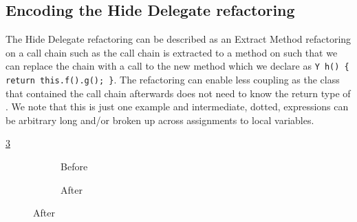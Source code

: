 \subsection{Encoding the Hide Delegate refactoring}\label{sec:hideDelegate}

The Hide Delegate refactoring can be described as an Extract Method refactoring on a call chain such as 
the call chain is extracted to a method on  such that we can replace the chain with a call to the new method 
which we declare as \lstinline|Y h() { return this.f().g(); }|.
The refactoring can enable less
coupling as the class that contained the call chain afterwards does not need to know the return type of .
We note that this is just one example and intermediate, dotted, expressions can be arbitrary long and/or broken up across assignments to local variables.

\ref{lst:HideDelegate-nofields-refinity}


\begin{figure}
  \centering
  \begin{subfigure}[b]{.4\linewidth}
    
    \caption{Before}
    \label{lst:HideDelegate-nofields-before-refinity}
  \end{subfigure}\hspace{1cm}
  \begin{subfigure}[b]{.4\linewidth}
    
    \caption{After}
    \label{lst:HideDelegate-nofields-after-refinity}
  \end{subfigure}
\label{lst:HideDelegate-nofields-refinity}
\end{figure}

